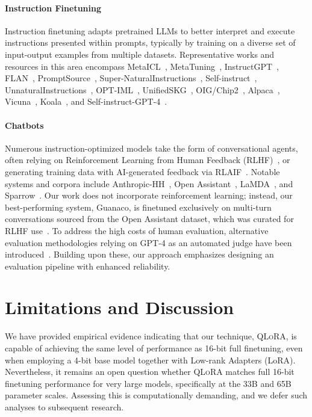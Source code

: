 \paragraph{Instruction Finetuning} Instruction finetuning adapts pretrained LLMs to better interpret and execute instructions presented within prompts, typically by training on a diverse set of input-output examples from multiple datasets. Representative works and resources in this area encompass MetaICL~\citep{min2021metaicl}, MetaTuning~\citep{zhong2021adapting}, InstructGPT~\citep{ouyang2022training}, FLAN~\citep{wei2021finetuned,chung2022scaling}, PromptSource~\citep{bach2022promptsource}, Super-NaturalInstructions~\citep{wang2022super,sanh2021multitask}, Self-instruct~\citep{wang2022self}, UnnaturalInstructions~\citep{honovich2022unnatural}, OPT-IML~\citep{iyer2022opt}, UnifiedSKG~\citep{xie2022unifiedskg}, OIG/Chip2~\citep{laion2023}, Alpaca~\citep{alpaca}, Vicuna~\citep{vicuna2023}, Koala~\citep{koala_blogpost_2023}, and Self-instruct-GPT-4~\citep{peng2023instruction}.

\paragraph{Chatbots} Numerous instruction-optimized models take the form of conversational agents, often relying on Reinforcement Learning from Human Feedback (RLHF)~\citep{christiano2017deep}, or generating training data with AI-generated feedback via RLAIF~\citep{bai2022constitutional}. Notable systems and corpora include Anthropic-HH~\citep{askell2021general,bai2022training}, Open Assistant~\citep{kopf2023openassistant}, LaMDA~\citep{thoppilan2022lamda}, and Sparrow~\citep{glaese2022improving}. Our work does not incorporate reinforcement learning; instead, our best-performing system, Guanaco, is finetuned exclusively on multi-turn conversations sourced from the Open Assistant dataset, which was curated for RLHF use~\citep{kopf2023openassistant}. To address the high costs of human evaluation, alternative evaluation methodologies relying on GPT-4 as an automated judge have been introduced~\citep{vicuna2023,peng2023instruction}. Building upon these, our approach emphasizes designing an evaluation pipeline with enhanced reliability.

\section{Limitations and Discussion}

We have provided empirical evidence indicating that our technique, \textsc{QLoRA}, is capable of achieving the same level of performance as 16-bit full finetuning, even when employing a 4-bit base model together with Low-rank Adapters (LoRA). Nevertheless, it remains an open question whether \textsc{QLoRA} matches full 16-bit finetuning performance for very large models, specifically at the 33B and 65B parameter scales. Assessing this is computationally demanding, and we defer such analyses to subsequent research.

